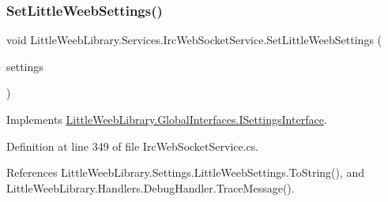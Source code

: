 \subsubsection{\texorpdfstring{Set\+Little\+Weeb\+Settings()}{SetLittleWeebSettings()}}
{\footnotesize\ttfamily void Little\+Weeb\+Library.\+Services.\+Irc\+Web\+Socket\+Service.\+Set\+Little\+Weeb\+Settings (\begin{DoxyParamCaption}\item[{\mbox{\hyperlink{class_little_weeb_library_1_1_settings_1_1_little_weeb_settings}{Little\+Weeb\+Settings}}}]{settings }\end{DoxyParamCaption})}



Implements \mbox{\hyperlink{interface_little_weeb_library_1_1_global_interfaces_1_1_i_settings_interface_a5c53e44105f1f4c7f8c3e546d29939d7}{Little\+Weeb\+Library.\+Global\+Interfaces.\+I\+Settings\+Interface}}.



Definition at line 349 of file Irc\+Web\+Socket\+Service.\+cs.



References Little\+Weeb\+Library.\+Settings.\+Little\+Weeb\+Settings.\+To\+String(), and Little\+Weeb\+Library.\+Handlers.\+Debug\+Handler.\+Trace\+Message().


